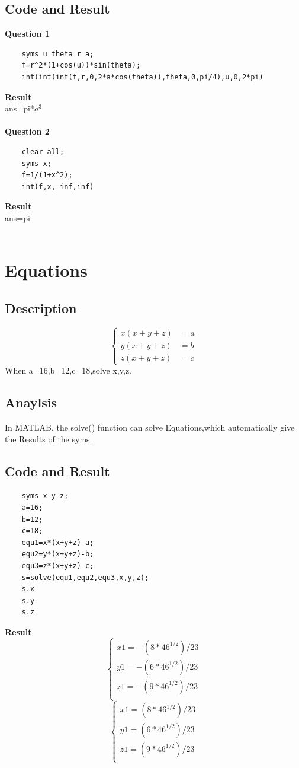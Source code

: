 \documentclass[UTF8,a4paper]{article}
\begin{document}
\subsection{Code and Result}
\textbf{Question 1}\\
\begin{lstlisting}
    syms u theta r a;
    f=r^2*(1+cos(u))*sin(theta);
    int(int(int(f,r,0,2*a*cos(theta)),theta,0,pi/4),u,0,2*pi)    
\end{lstlisting}
\textbf{Result}\\
ans=pi*$a^3$\\\\
\textbf{Question 2}\\
\begin{lstlisting}
    clear all;
    syms x;
    f=1/(1+x^2);
    int(f,x,-inf,inf)    
\end{lstlisting}
\textbf{Result}\\
ans=pi\\\\
\section{Equations}
\subsection{Description}
$$
    \left\{  
        \begin{aligned}  
        x(x+y+z)&=a\\
        y(x+y+z)&=b\\
        z(x+y+z)&=c        
        \end{aligned}  
    \right.  
$$  
When a=16,b=12,c=18,solve x,y,z.
\subsection{Anaylsis}
\noindent In MATLAB, the solve() function can solve Equations,which automatically give the Results of the syms. 
\subsection{Code and Result}
\begin{lstlisting}
    syms x y z;
    a=16;
    b=12;
    c=18;
    equ1=x*(x+y+z)-a;
    equ2=y*(x+y+z)-b;
    equ3=z*(x+y+z)-c;
    s=solve(equ1,equ2,equ3,x,y,z);
    s.x
    s.y
    s.z    
\end{lstlisting}
\textbf{Result}\\
$$
    \left\{
    \begin{aligned}
    x1=-(8*46^{1/2})/23\\
    y1=-(6*46^{1/2})/23\\
    z1=-(9*46^{1/2})/23\\
    \end{aligned}
\right.
$$
$$
    \left\{
    \begin{aligned}
    x1=(8*46^{1/2})/23\\
    y1=(6*46^{1/2})/23\\
    z1=(9*46^{1/2})/23\\
    \end{aligned}
\right.
$$
\end{document}
